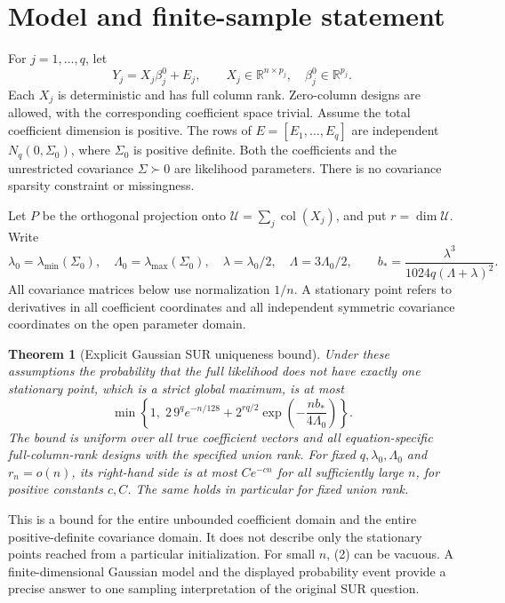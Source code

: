 \documentclass[11pt]{article}
\newtheorem{theorem}{Theorem}
\begin{document}
\section{Model and finite-sample statement}

For \(j=1,\ldots,q\), let
\[
 Y_j=X_j\beta_j^0+E_j,\qquad
 X_j\in\mathbb R^{n\times p_j},\quad
 \beta_j^0\in\mathbb R^{p_j}.
\]
Each \(X_j\) is deterministic and has full column rank. Zero-column
designs are allowed, with the corresponding coefficient space trivial.
Assume the total coefficient dimension is positive. The rows of
\(E=[E_1,\ldots,E_q]\) are independent \(N_q(0,\Sigma_0)\), where
\(\Sigma_0\) is positive definite. Both the coefficients and the
unrestricted covariance \(\Sigma\succ0\) are likelihood parameters.
There is no covariance sparsity constraint or missingness.

Let \(P\) be the orthogonal projection onto
\(\mathcal U=\sum_j\operatorname{col}(X_j)\), and put \(r=\dim\mathcal U\).
Write
\[
 \lambda_0=\lambda_{\min}(\Sigma_0),\quad
 \Lambda_0=\lambda_{\max}(\Sigma_0),\quad
 \lambda=\lambda_0/2,\quad \Lambda=3\Lambda_0/2,
 \qquad
 b_*=\frac{\lambda^3}{1024q(\Lambda+\lambda)^2}.
 \tag{1}
\]
All covariance matrices below use normalization \(1/n\).
A stationary point refers to derivatives in all coefficient coordinates
and all independent symmetric covariance coordinates on the open
parameter domain.

\begin{theorem}[Explicit Gaussian SUR uniqueness bound]\label{thm:main}
Under these assumptions the probability that the full likelihood does
not have exactly one stationary point, which is a strict global
maximum, is at most
\[
 \min\left\{1,\;
 2\,9^q e^{-n/128}
 +2^{rq/2}\exp\left(-\frac{n b_*}{4\Lambda_0}\right)
 \right\}.
 \tag{2}
\]
The bound is uniform over all true coefficient vectors and all
equation-specific full-column-rank designs with the specified union
rank. For fixed \(q,\lambda_0,\Lambda_0\) and \(r_n=o(n)\), its
right-hand side is at most \(C e^{-cn}\) for all sufficiently large
\(n\), for positive constants \(c,C\). The same holds in particular
for fixed union rank.
\end{theorem}

This is a bound for the entire unbounded coefficient domain and the
entire positive-definite covariance domain. It does not describe only
the stationary points reached from a particular initialization.
For small \(n\), (2) can be vacuous. A finite-dimensional Gaussian
model and the displayed probability event provide a precise answer
to one sampling interpretation of the original SUR question.
\end{document}
